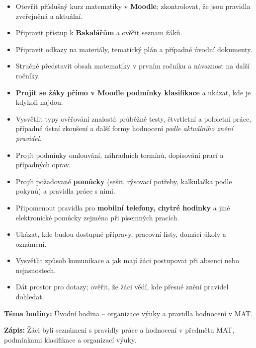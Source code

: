 \documentclass[11pt,a4paper]{article}
\begin{document}
\begin{itemize}[label=$\square$]
  \item Otevřít příslušný kurz matematiky v \textbf{Moodle}; zkontrolovat, že jsou pravidla zveřejněná a aktuální.
  \item Připravit přístup k \textbf{Bakalářům} a ověřit seznam žáků.
  \item Připravit odkazy na materiály, tematický plán a případné úvodní dokumenty.
\end{itemize}

\begin{itemize}[label=$\square$]
  \item Stručně představit obsah matematiky v prvním ročníku a návaznost na další ročníky.
  \item \textbf{Projít se žáky přímo v Moodle podmínky klasifikace} a ukázat, kde je kdykoli najdou.
  \item Vysvětlit typy ověřování znalostí: průběžné testy, čtvrtletní a pololetní práce, případné ústní zkoušení a další formy hodnocení \emph{podle aktuálního znění pravidel}.
  \item Projít podmínky omlouvání, náhradních termínů, dopisování prací a případných oprav.
  \item Projít požadované \textbf{pomůcky} (sešit, rýsovací potřeby, kalkulačka podle pokynů) a pravidla práce s nimi.
  \item Připomenout pravidla pro \textbf{mobilní telefony, chytré hodinky} a jiné elektronické pomůcky zejména při písemných pracích.
  \item Ukázat, kde budou dostupné přípravy, pracovní listy, domácí úkoly a oznámení.
  \item Vysvětlit způsob komunikace a jak mají žáci postupovat při absenci nebo nejasnostech.
  \item Dát prostor pro dotazy; ověřit, že žáci vědí, kde přesné znění pravidel dohledat.
\end{itemize}


\begin{zadaniBox}[title={Poznámka pro učitele - Zápis do Bakalářů}]
\textbf{Téma hodiny:} Úvodní hodina -- organizace výuky a pravidla hodnocení v MAT.

\medskip
\textbf{Zápis:} Žáci byli seznámeni s pravidly práce a hodnocení v předmětu MAT, podmínkami klasifikace a organizací výuky.
\end{zadaniBox}
\end{document}
